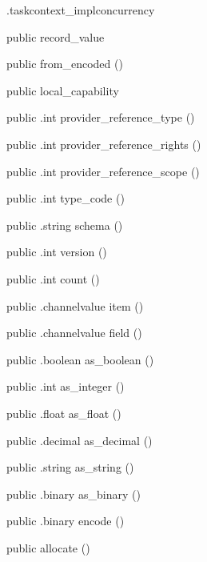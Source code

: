 \begin{CrexxClass}{.taskcontext\_impl}{concurrency}
\begin{Members}
    \Factory
      {public}
      {record\_value}
      {}

    \Factory
      {public}
      {from\_encoded}
      {()}

    \Factory
      {public}
      {local\_capability}
      {}

    \Method
      {public}
      {.int}
      {provider\_reference\_type}
      {()}

    \Method
      {public}
      {.int}
      {provider\_reference\_rights}
      {()}

    \Method
      {public}
      {.int}
      {provider\_reference\_scope}
      {()}

    \Method
      {public}
      {.int}
      {type\_code}
      {()}

    \Method
      {public}
      {.string}
      {schema}
      {()}

    \Method
      {public}
      {.int}
      {version}
      {()}

    \Method
      {public}
      {.int}
      {count}
      {()}

    \Method
      {public}
      {.channelvalue}
      {item}
      {()}

    \Method
      {public}
      {.channelvalue}
      {field}
      {()}

    \Method
      {public}
      {.boolean}
      {as\_boolean}
      {()}

    \Method
      {public}
      {.int}
      {as\_integer}
      {()}

    \Method
      {public}
      {.float}
      {as\_float}
      {()}

    \Method
      {public}
      {.decimal}
      {as\_decimal}
      {()}

    \Method
      {public}
      {.string}
      {as\_string}
      {()}

    \Method
      {public}
      {.binary}
      {as\_binary}
      {()}

    \Method
      {public}
      {.binary}
      {encode}
      {()}

    \Factory
      {public}
      {allocate}
      {()}


\end{Members}
\end{CrexxClass}

